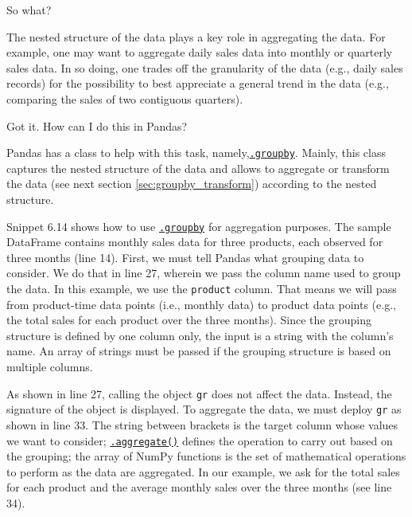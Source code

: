 \documentclass[a4paper,11pt]{book}
\newcommand{\question}[1]{%
    \begin{tcolorbox}[colback=comp_c!10,colframe=comp_c,sidebyside align=top,width=\linewidth,before skip=1ex]
        #1
    \end{tcolorbox}
    \switchcolumn%
}
\newcommand{\note}[1]{%
    \begin{tcolorbox}[colback=white!0,colframe=white!10,width=\linewidth,before skip=1ex]
        #1
    \end{tcolorbox}
}
\begin{document}
\begin{paracol}{2}
	\question{\raggedright So what?}
	\note{The nested structure of the data plays a key role in aggregating the data. For example, one may want to aggregate daily sales data into monthly or quarterly sales data. In so doing, one trades off the granularity of the data (e.g., daily sales records) for the possibility to best appreciate a general trend in the data (e.g., comparing the sales of two contiguous quarters).} 
\end{paracol}

\begin{paracol}{2}
	\question{\raggedright Got it. How can I do this in Pandas?}
	\note{Pandas has a class to help with this task, namely,\href{https://pandas.pydata.org/docs/reference/api/pandas.DataFrame.groupby.html#pandas.DataFrame.groupby}{\texttt{.groupby}}. Mainly, this class captures the nested structure of the data and allows to aggregate or transform the data (see next section \ref{sec:groupby_transform}) according to the nested structure.
	
	\quad Snippet 6.14 shows how to use \href{https://pandas.pydata.org/docs/reference/api/pandas.DataFrame.groupby.html#pandas.DataFrame.groupby}{\texttt{.groupby}} for aggregation purposes. The sample DataFrame contains monthly sales data for three products, each observed for three months (line 14). First, we must tell Pandas what grouping data to consider. We do that in line 27, wherein we pass the column name used to group the data. In this example, we use the \texttt{product} column. That means we will pass from product-time data points (i.e., monthly data) to product data points (e.g., the total sales for each product over the three months). Since the grouping structure is defined by one column only, the input is a string with the column's name. An array of strings must be passed if the grouping structure is based on multiple columns.
	
	\quad As shown in line 27, calling the object \texttt{gr} does not affect the data. Instead, the signature of the object is displayed. To aggregate the data, we must deploy \texttt{gr} as shown in line 33. The string between brackets is the target column whose values we want to consider; \href{https://pandas.pydata.org/docs/reference/api/pandas.core.groupby.DataFrameGroupBy.aggregate.html?highlight=aggregate#pandas.core.groupby.DataFrameGroupBy.aggregate}{\texttt{.aggregate()}} defines the operation to carry out based on the grouping; the array of NumPy functions is the set of mathematical operations to perform as the data are aggregated. In our example, we ask for the total sales for each product and the average monthly sales over the three months (see line 34).
	}
\end{paracol}
\end{document}
